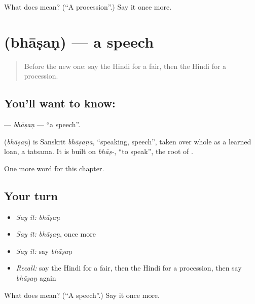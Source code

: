 \begin{tcolorbox}[breakable,colback=teal!4,colframe=teal!35!black,title={Before you move on}]
What does  mean? (\textquotedblleft{}A procession\textquotedblright{}.) Say it once more.
\end{tcolorbox}
\section[\texorpdfstring{\hi{भाषण} (bhāṣaṇ)}{भाषण (bhāṣaṇ)}]{ (bhāṣaṇ) — a speech}

\label{lesson:HI-C272-bhasan}



\begin{quote}
Before the new one: say the Hindi for a fair, then the Hindi for a procession.
\end{quote}

\subsection*{You'll want to know: }
\textbf{} — \emph{bhāṣaṇ} — \textquotedblleft{}a speech\textquotedblright{}.

\begin{cousinweb}
\textbf{} (\emph{bhāṣaṇ}) is Sanskrit \emph{bhāṣaṇa}, \textquotedblleft{}speaking, speech\textquotedblright{}, taken over whole as a learned loan, a tatsama. It is built on \emph{bhāṣ-}, \textquotedblleft{}to speak\textquotedblright{}, the root of \textbf{}.
\end{cousinweb}

\begin{grammarlens}[title={What you've built}]
One more word for this chapter.
\end{grammarlens}

\subsection*{Your turn}
\begin{itemize}
\raggedright
  \item \emph{Say it:} \emph{bhāṣaṇ}
  \item \emph{Say it:} \emph{bhāṣaṇ}, once more
  \item \emph{Say it:} say \emph{bhāṣaṇ}
  \item \emph{Recall:} say the Hindi for a fair, then the Hindi for a procession, then say \emph{bhāṣaṇ} again
\end{itemize}

\begin{tcolorbox}[breakable,colback=teal!4,colframe=teal!35!black,title={Before you move on}]
What does  mean? (\textquotedblleft{}A speech\textquotedblright{}.) Say it once more.
\end{tcolorbox}
